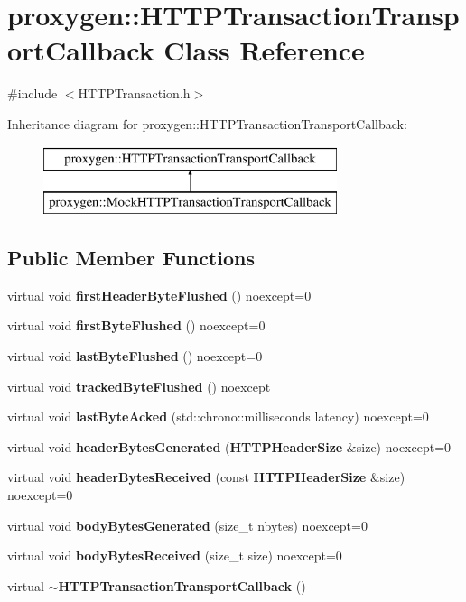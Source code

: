 \section{proxygen\+:\+:H\+T\+T\+P\+Transaction\+Transport\+Callback Class Reference}
\label{classproxygen_1_1HTTPTransactionTransportCallback}


{\ttfamily \#include $<$H\+T\+T\+P\+Transaction.\+h$>$}

Inheritance diagram for proxygen\+:\+:H\+T\+T\+P\+Transaction\+Transport\+Callback\+:\begin{figure}[H]
\begin{center}
\leavevmode
\includegraphics[height=2.000000cm]{classproxygen_1_1HTTPTransactionTransportCallback}
\end{center}
\end{figure}
\subsection*{Public Member Functions}
\begin{DoxyCompactItemize}
\item 
virtual void {\bf first\+Header\+Byte\+Flushed} () noexcept=0
\item 
virtual void {\bf first\+Byte\+Flushed} () noexcept=0
\item 
virtual void {\bf last\+Byte\+Flushed} () noexcept=0
\item 
virtual void {\bf tracked\+Byte\+Flushed} () noexcept
\item 
virtual void {\bf last\+Byte\+Acked} (std\+::chrono\+::milliseconds latency) noexcept=0
\item 
virtual void {\bf header\+Bytes\+Generated} ({\bf H\+T\+T\+P\+Header\+Size} \&size) noexcept=0
\item 
virtual void {\bf header\+Bytes\+Received} (const {\bf H\+T\+T\+P\+Header\+Size} \&size) noexcept=0
\item 
virtual void {\bf body\+Bytes\+Generated} (size\+\_\+t nbytes) noexcept=0
\item 
virtual void {\bf body\+Bytes\+Received} (size\+\_\+t size) noexcept=0
\item 
virtual {\bf $\sim$\+H\+T\+T\+P\+Transaction\+Transport\+Callback} ()
\end{DoxyCompactItemize}


